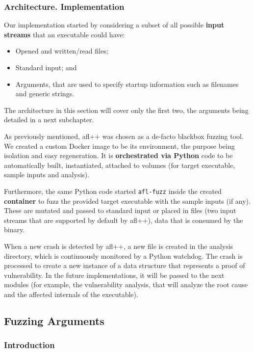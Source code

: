 \documentclass[12pt,a4paper,english,onecolumn]{IEEEtran}
\begin{document}
\subsubsection{Architecture. Implementation}

Our implementation started by considering a subset of all possible \textbf{input streams} that an executable could have:
\begin{itemize}
    \item Opened and written/read files;
    \item Standard input; and
    \item Arguments, that are used to specify startup information such as filenames and generic strings.
\end{itemize}

The architecture in this section will cover only the first two, the arguments being detailed in a next subchapter.

As previously mentioned, afl++ was chosen as a de-facto blackbox fuzzing tool. We created a custom Docker image to be its environment, the purpose being isolation and easy regeneration. It is \textbf{orchestrated via Python} code to be automatically built, instantiated, attached to volumes (for target executable, sample inputs and analysis).

Furthermore, the same Python code started \texttt{afl-fuzz} inside the created \textbf{container} to fuzz the provided target executable with the sample inputs (if any). These are mutated and passed to standard input or placed in files (two input streams that are supported by default by afl++), data that is consumed by the binary.

When a new crash is detected by afl++, a new file is created in the analysis directory, which is continuously monitored by a Python watchdog. The crash is processed to create a new instance of a data structure that represents a proof of vulnerability. In the future implementations, it will be passed to the next modules (for example, the vulnerability analysis, that will analyze the root cause and the affected internals of the executable).

\subsection{Fuzzing Arguments}

\subsubsection{Introduction}
\end{document}
